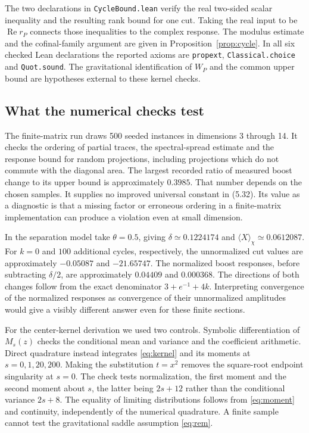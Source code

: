 \documentclass[11pt]{article}
\begin{document}
The two declarations in \texttt{CycleBound.lean} verify the real two-sided scalar inequality and the resulting rank bound for one cut. Taking the real input to be $\operatorname{Re}r_P$ connects those inequalities to the complex response. The modulus estimate and the cofinal-family argument are given in Proposition~\ref{prop:cycle}. In all six checked Lean declarations the reported axioms are \texttt{propext}, \texttt{Classical.choice} and \texttt{Quot.sound}. The gravitational identification of $W_P$ and the common upper bound are hypotheses external to these kernel checks.

\subsection{What the numerical checks test}
The finite-matrix run draws 500 seeded instances in dimensions 3 through 14. It checks the ordering of partial traces, the spectral-spread estimate and the response bound for random projections, including projections which do not commute with the diagonal area. The largest recorded ratio of measured boost change to its upper bound is approximately $0.3985$. That number depends on the chosen samples. It supplies no improved universal constant in (5.32). Its value as a diagnostic is that a missing factor or erroneous ordering in a finite-matrix implementation can produce a violation even at small dimension.

In the separation model take $\theta=0.5$, giving $\delta\simeq0.1224174$ and $\langle X\rangle_\chi\simeq0.0612087$. For $k=0$ and $100$ additional cycles, respectively, the unnormalized cut values are approximately $-0.05087$ and $-21.65747$. The normalized boost responses, before subtracting $\delta/2$, are approximately $0.04409$ and $0.000368$. The directions of both changes follow from the exact denominator $3+e^{-1}+4k$. Interpreting convergence of the normalized responses as convergence of their unnormalized amplitudes would give a visibly different answer even for these finite sections.

For the center-kernel derivation we used two controls. Symbolic differentiation of $M_s(z)$ checks the conditional mean and variance and the coefficient arithmetic. Direct quadrature instead integrates \eqref{eq:kernel} and its moments at $s=0,1,20,200$. Making the substitution $t=x^2$ removes the square-root endpoint singularity at $s=0$. The check tests normalization, the first moment and the second moment about $s$, the latter being $2s+12$ rather than the conditional variance $2s+8$. The equality of limiting distributions follows from \eqref{eq:moment} and continuity, independently of the numerical quadrature. A finite sample cannot test the gravitational saddle assumption \eqref{eq:rem}.
\end{document}
